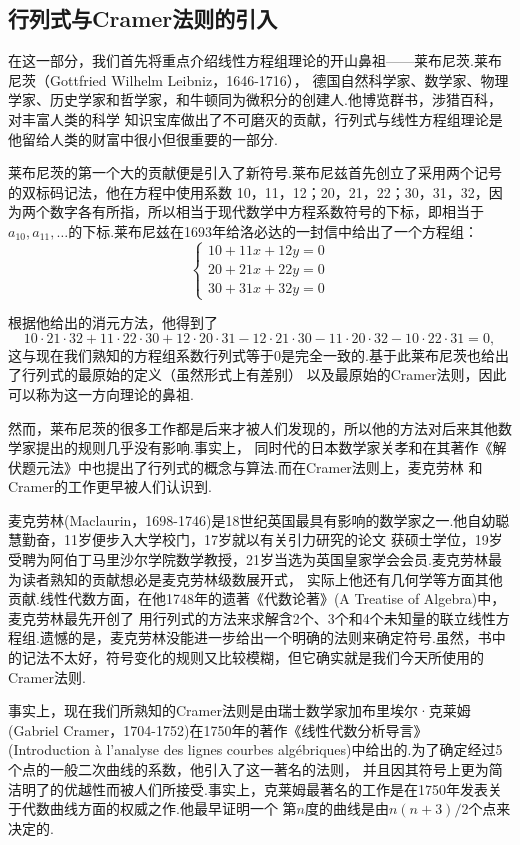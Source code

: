 \subsection{行列式与Cramer法则的引入}
在这一部分，我们首先将重点介绍线性方程组理论的开山鼻祖——莱布尼茨.莱布尼茨（Gottfried Wilhelm Leibniz，1646-1716），
德国自然科学家、数学家、物理学家、历史学家和哲学家，和牛顿同为微积分的创建人.他博览群书，涉猎百科，对丰富人类的科学
知识宝库做出了不可磨灭的贡献，行列式与线性方程组理论是他留给人类的财富中很小但很重要的一部分.

莱布尼茨的第一个大的贡献便是引入了新符号.莱布尼兹首先创立了采用两个记号的双标码记法，他在方程中使用系数
10，11，12；20，21，22；30，31，32，因为两个数字各有所指，所以相当于现代数学中方程系数符号的下标，即相当于
$a_{10},a_{11},\ldots$的下标.莱布尼兹在1693年给洛必达的一封信中给出了一个方程组：
\[\begin{cases}
    10+11x+12y=0\\
    20+21x+22y=0\\
    30+31x+32y=0
\end{cases}\]

根据他给出的消元方法，他得到了\[10\cdot 21\cdot 32+11\cdot 22\cdot 30+12\cdot 20\cdot 31-12\cdot 21\cdot 30-11\cdot 20\cdot 32-10\cdot 22\cdot 31=0,\]
这与现在我们熟知的方程组系数行列式等于0是完全一致的.基于此莱布尼茨也给出了行列式的最原始的定义（虽然形式上有差别）
以及最原始的Cramer法则，因此可以称为这一方向理论的鼻祖.

然而，莱布尼茨的很多工作都是后来才被人们发现的，所以他的方法对后来其他数学家提出的规则几乎没有影响.事实上，
同时代的日本数学家关孝和在其著作《解伏题元法》中也提出了行列式的概念与算法.而在Cramer法则上，麦克劳林
和Cramer的工作更早被人们认识到.

麦克劳林(Maclaurin，1698-1746)是18世纪英国最具有影响的数学家之一.他自幼聪慧勤奋，11岁便步入大学校门，17岁就以有关引力研究的论文
获硕士学位，19岁受聘为阿伯丁马里沙尔学院数学教授，21岁当选为英国皇家学会会员.麦克劳林最为读者熟知的贡献想必是麦克劳林级数展开式，
实际上他还有几何学等方面其他贡献.线性代数方面，在他1748年的遗著《代数论著》(A Treatise of Algebra)中，麦克劳林最先开创了
用行列式的方法来求解含2个、3个和4个未知量的联立线性方程组.遗憾的是，麦克劳林没能进一步给出一个明确的法则来确定符号.虽然，书中
的记法不太好，符号变化的规则又比较模糊，但它确实就是我们今天所使用的Cramer法则.

事实上，现在我们所熟知的Cramer法则是由瑞士数学家加布里埃尔·克莱姆(Gabriel Cramer，1704-1752)在1750年的著作《线性代数分析导言》
(Introduction à l'analyse des lignes courbes algébriques)中给出的.为了确定经过5个点的一般二次曲线的系数，他引入了这一著名的法则，
并且因其符号上更为简洁明了的优越性而被人们所接受.事实上，克莱姆最著名的工作是在1750年发表关于代数曲线方面的权威之作.他最早证明一个
第$n$度的曲线是由$n(n + 3)/2$个点来决定的.

